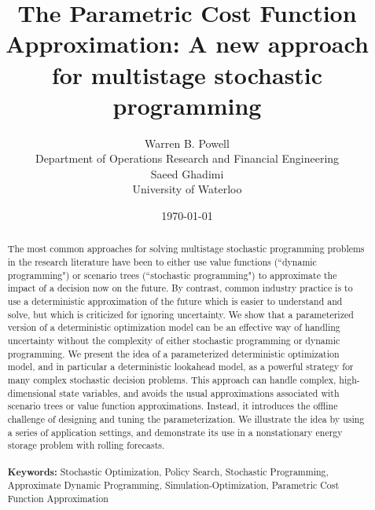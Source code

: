 \documentclass[11pt,oneside,fleqn,reqno,titlepage]{article}
\begin{document}
\title{The Parametric Cost Function Approximation: A new approach for multistage stochastic programming}
\author{Warren B. Powell \\ Department of Operations Research and Financial Engineering \\
        Saeed Ghadimi \\ University of Waterloo}
\date{\today}

\maketitle

\clearpage

\begin{abstract}
The most common approaches for solving multistage stochastic programming problems in the research literature have been to either use value functions (``dynamic programming") or scenario trees (``stochastic programming") to approximate the impact of a decision now on the future.  By contrast, common industry practice is to use a deterministic approximation of the future which is easier to understand and solve, but which is criticized for ignoring uncertainty.  We show that a parameterized version of a deterministic optimization model can be an effective way of handling uncertainty without the complexity of either stochastic programming or dynamic programming.  We present the idea of a parameterized deterministic optimization model, and in particular a deterministic lookahead model, as a powerful strategy for many complex stochastic decision problems.  This approach can handle complex, high-dimensional state variables, and avoids the usual approximations associated with scenario trees or value function approximations.  Instead, it introduces the offline challenge of designing and tuning the parameterization.  We illustrate the idea by using a series of application settings, and demonstrate its use in a nonstationary energy storage problem with rolling forecasts.\\ \\
{\bf{Keywords:}} Stochastic Optimization, Policy Search, Stochastic Programming, Approximate Dynamic Programming, Simulation-Optimization, Parametric Cost Function Approximation
\end{abstract}
\end{document}
